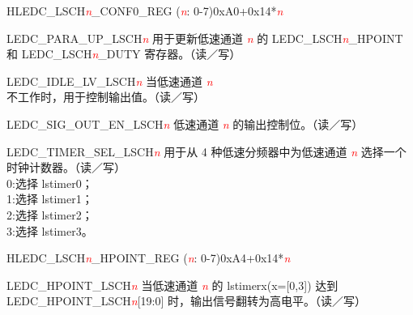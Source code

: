\begin{register}{H}{LEDC\_LSCH\textit{\textcolor{red}{\it{n}}}\_CONF0\_REG (\textit{\textcolor{red}{\it{n}}}: 0-7)}{0xA0+0x14*\textit{\textcolor{red}{\it{n}}}}\label{regdesc:LEDCLSCHnCONF0REG}
%
%
%
%
%
\regnewline%
\begin{regdesc}\begin{reglist}
\item [LEDC\_PARA\_UP\_LSCH\textcolor{red}{\it{n}}] 用于更新低速通道 \textcolor{red}{\it{n}} 的 LEDC\_LSCH\textcolor{red}{\it{n}}\_HPOINT 和 LEDC\_LSCH\textcolor{red}{\it{n}}\_DUTY 寄存器。（读／写）
\item [LEDC\_IDLE\_LV\_LSCH\textcolor{red}{\it{n}}] 当低速通道 \textcolor{red}{\it{n}} 不工作时，用于控制输出值。（读／写）
\item [LEDC\_SIG\_OUT\_EN\_LSCH\textcolor{red}{\it{n}}] 低速通道 \textcolor{red}{\it{n}} 的输出控制位。（读／写）
\item [LEDC\_TIMER\_SEL\_LSCH\textcolor{red}{\it{n}}] 用于从 4 种低速分频器中为低速通道 \textcolor{red}{\it{n}} 选择一个时钟计数器。（读／写）\\
0:选择 lstimer0；\\
1:选择 lstimer1；\\
2:选择 lstimer2；\\
 3:选择 lstimer3。
\end{reglist}\end{regdesc}
\end{register}


\begin{register}{H}{LEDC\_LSCH\textit{\textcolor{red}{\it{n}}}\_HPOINT\_REG (\textit{\textcolor{red}{\it{n}}}: 0-7)}{0xA4+0x14*\textit{\textcolor{red}{\it{n}}}}\label{regdesc:LEDCLSCHnHPOINTREG}
%
%
\regnewline%
\begin{regdesc}\begin{reglist}
\item [LEDC\_HPOINT\_LSCH\textcolor{red}{\it{n}}]\label{regdesc:LEDCHPOINTLSCHn} 当低速通道 \textcolor{red}{\it{n}} 的 lstimerx(x=[0,3]) 达到 LEDC\_HPOINT\_LSCH\textcolor{red}{\it{n}}[19:0] 时，输出信号翻转为高电平。（读／写）
\end{reglist}\end{regdesc}
\end{register}


